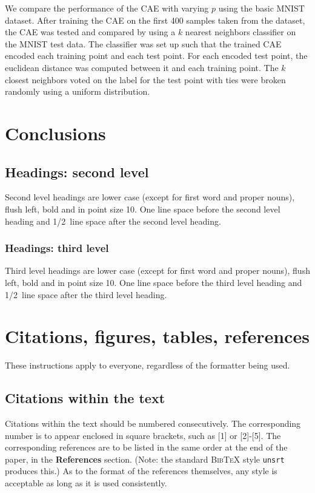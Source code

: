 \documentclass{article} %
\begin{document}
We compare the performance of the CAE with varying $p$ using the basic MNIST dataset. After training the CAE on the first 400 samples taken from the dataset, the CAE was tested and compared by using a $k$ nearest neighbors classifier on the MNIST test data. The classifier was set up such that the trained CAE encoded each training point and each test point. For each encoded test point, the euclidean distance was computed between it and each training point. The $k$ closest neighbors voted on the label for the test point with ties were broken randomly using a uniform distribution.



\section{Conclusions}


\subsection{Headings: second level}

Second level headings are lower case (except for first word and proper nouns),
flush left, bold and in point size 10. One line space before the second level
heading and 1/2~line space after the second level heading.

\subsubsection{Headings: third level}

Third level headings are lower case (except for first word and proper nouns),
flush left, bold and in point size 10. One line space before the third level
heading and 1/2~line space after the third level heading.

\section{Citations, figures, tables, references}
\label{others}

These instructions apply to everyone, regardless of the formatter being used.

\subsection{Citations within the text}

Citations within the text should be numbered consecutively. The corresponding
number is to appear enclosed in square brackets, such as [1] or [2]-[5]. The
corresponding references are to be listed in the same order at the end of the
paper, in the \textbf{References} section. (Note: the standard
\textsc{Bib\TeX} style \texttt{unsrt} produces this.) As to the format of the
references themselves, any style is acceptable as long as it is used
consistently.
\end{document}
